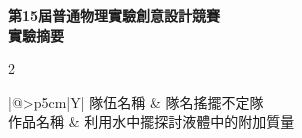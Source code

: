 \documentclass[10pt]{article}
\begin{document}
\begin{center}
    \begin{minipage}{0.65\textwidth}
        \centering
        {\Large \bfseries 第15屆普通物理實驗創意設計競賽}\\[0.2cm]
        {\Large \bfseries 實驗摘要}
    \end{minipage}
\end{center}
\vspace{0.5cm}
\begin{spacing}{2}
\noindent\begin{tabularx}{\linewidth}{|@{}>{\centering\arraybackslash}p{5cm}|Y|}
    \hline
    隊伍名稱 & 隊名搖擺不定隊 \\ 
    \hline
    作品名稱 & 利用水中擺探討液體中的附加質量\\ 
    \hline
\end{tabularx}
\end{spacing}
\vspace{-0.75cm}
\end{document}
